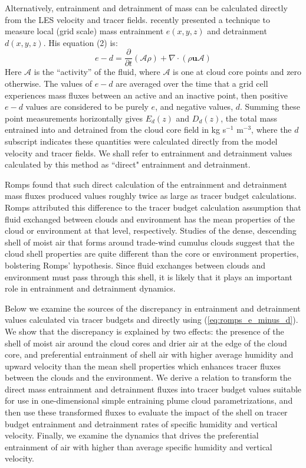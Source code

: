 \documentclass[12pt]{article}
\begin{document}
Alternatively, entrainment and detrainment of mass can be calculated directly
from the LES velocity and tracer fields.  \cite{Romps2010} recently presented a 
technique to measure local (grid scale) mass entrainment $e(x,y,z)$ and
detrainment $d(x,y,z)$.  His equation (2) is:
\begin{equation}
  \label{eq:romps_e_minus_d}
  e - d = \frac{\partial}{\partial t}(\mathcal{A}\rho) 
        + \nabla \cdot (\rho \mathbf{u} \mathcal{A}) 
\end{equation}
Here $\mathcal{A}$ is the ``activity'' of the fluid, where
$\mathcal{A}$ is one at cloud core points and zero otherwise.  The values of
$e - d$ are averaged over the time that a grid cell experiences mass
fluxes between an active and an inactive point, then positive $e-d$
values are considered to be purely $e$, and negative values, $d$.  
Summing these point measurements horizontally gives 
$E_d(z)$ and $D_d(z)$, the total mass entrained into and detrained from the
cloud core field in kg s$^{-1}$ m$^{-3}$, where the $d$ subscript indicates 
these quantities were calculated directly from the model velocity and tracer
fields.  We shall refer to entrainment and detrainment values
calculated by this method as ``direct" entrainment and detrainment.

Romps found that such direct calculation of the entrainment and
detrainment mass fluxes produced values roughly twice as large as
tracer budget calculations.  Romps attributed this difference to the 
tracer budget calculation assumption that fluid exchanged between clouds 
and environment has the mean properties of the cloud or environment at 
that level, respectively.  Studies of the dense, descending shell of 
moist air that forms around trade-wind cumulus clouds 
\citep{Jonas1990, Rodts2003, Heus2008, Jonker2008, Heus2009, Wang2010} 
suggest that the cloud shell properties are quite different than the core 
or environment properties, bolstering Romps' hypothesis.  Since fluid 
exchanges between clouds and environment must pass through this shell, it 
is likely that it plays an important role in entrainment and detrainment
dynamics.

Below we examine the sources of the discrepancy in entrainment and
detrainment values calculated via tracer budgets and directly
using (\ref{eq:romps_e_minus_d}).  We show that the discrepancy is explained by 
two effects: the presence of the shell of moist air around the cloud cores
and drier air at the edge of the cloud core, and preferential entrainment of 
shell air with higher average humidity and upward velocity than the mean shell 
properties which enhances tracer fluxes between the clouds and the environment.
We derive a relation to transform the direct mass entrainment and detrainment 
fluxes into tracer budget values suitable for use in one-dimensional simple 
entraining plume cloud parametrizations, and then use these transformed fluxes 
to evaluate the impact of the shell on tracer budget entrainment and 
detrainment rates of specific humidity and vertical velocity.  Finally, we
examine the dynamics that drives the preferential entrainment of air with 
higher than average specific humidity and vertical velocity.
\end{document}
